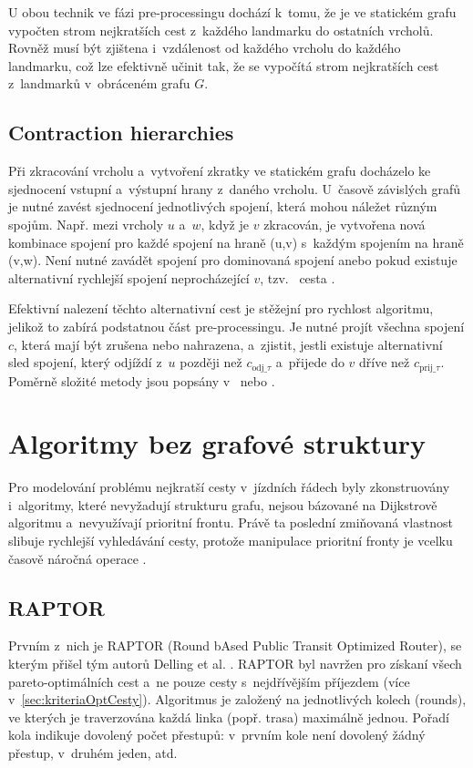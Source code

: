 \renewcommand{\figureautorefname}{obrázek}
U obou technik ve fázi pre-processingu dochází k~tomu, že je ve statickém grafu vypočten strom nejkratších cest z~každého landmarku do ostatních vrcholů. Rovněž musí být zjištena i~vzdálenost od každého vrcholu do každého landmarku, což lze efektivně učinit tak, že se vypočítá strom nejkratších cest z~landmarků v~obráceném grafu \(G\). 

\subsection{Contraction hierarchies}
Při zkracování vrcholu a~vytvoření zkratky ve statickém grafu docházelo ke sjednocení vstupní a~výstupní hrany z~daného vrcholu. U~časově závislých grafů je nutné zavést sjednocení jednotlivých spojení, která mohou náležet různým spojům. Např. mezi vrcholy $u$ a~$w$, když je $v$ zkracován, je vytvořena nová kombinace spojení pro každé spojení na hraně (u,v) s~každým spojením na hraně (v,w). Není nutné zavádět spojení pro dominovaná spojení anebo pokud existuje alternativní rychlejší spojení neprocházející $v$, tzv.~ cesta \cite{wirthCHDiploma}.

Efektivní nalezení těchto alternativní cest je stěžejní pro rychlost algoritmu, jelikož to zabírá podstatnou část pre-processingu. Je nutné projít všechna spojení $c$, která mají být zrušena nebo nahrazena, a~zjistit, jestli existuje alternativní sled spojení, který odjíždí z~$u$ později než $c_{\text{odj\_}\tau}$ a~přijede do $v$ dříve než $c_{\text{prij\_}\tau}$. Poměrně složité metody jsou popsány v~\cite{BatzTDCH} nebo \cite{wirthCHDiploma}.

\section{Algoritmy bez grafové struktury}
Pro modelování problému nejkratší cesty v~jízdních řádech byly zkonstruovány i~algoritmy, které nevyžadují strukturu grafu, nejsou bázované na Dijkstrově algoritmu a~nevyužívají prioritní frontu. Právě ta poslední zmiňovaná vlastnost slibuje rychlejší vyhledávání cesty, protože manipulace prioritní fronty je vcelku časově náročná operace \cite{CMUBinHeaps}.

\subsection{RAPTOR}
Prvním z~nich je RAPTOR (Round bAsed Public Transit Optimized Router), se kterým přišel tým autorů Delling et al. \cite{dellingRAPTOR}. RAPTOR byl navržen pro získaní všech pareto-optimálních cest a~ne pouze cesty s~nejdřívějším příjezdem (více v~\autoref{sec:kriteriaOptCesty}). Algoritmus je založený na jednotlivých kolech (rounds), ve kterých je traverzována každá linka (popř. trasa) maximálně jednou. Pořadí kola indikuje dovolený počet přestupů: v~prvním kole není dovolený žádný přestup, v~druhém jeden, atd.

